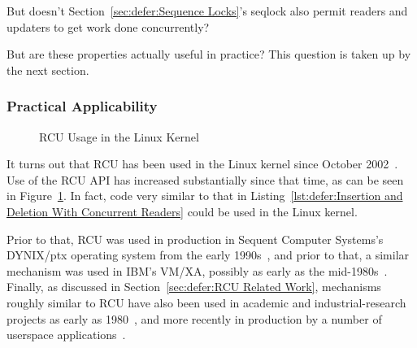 \QuickQuiz{}
	But doesn't Section~\ref{sec:defer:Sequence Locks}'s seqlock
	also permit readers and updaters to get work done concurrently?
 \QuickQuizEnd

But are these properties actually useful in practice?
This question is taken up by the next section.

\subsubsection{Practical Applicability}
\label{sec:defer:Practical Applicability}

\begin{figure}[tb]
\centering
{}
\caption{RCU Usage in the Linux Kernel}
\label{fig:defer:RCU Usage in the Linux Kernel}
\end{figure}

It turns out that RCU has been used in the Linux kernel since
October 2002~\cite{Torvalds2.5.43}.
Use of the RCU API has increased substantially since that time,
as can be seen in
Figure~\ref{fig:defer:RCU Usage in the Linux Kernel}.
In fact, code very similar to that in
Listing~\ref{lst:defer:Insertion and Deletion With Concurrent Readers}
could be used in the Linux kernel.

Prior to that, RCU was used in production in Sequent Computer Systems's
DYNIX/ptx operating system from the early 1990s~\cite{McKenney98},
and prior to that, a similar mechanism was used in IBM's
VM/XA, possibly as early as the mid-1980s~\cite{Hennessy89}.
Finally, as discussed in
Section~\ref{sec:defer:RCU Related Work},
mechanisms roughly similar to RCU have also been used
in academic and industrial-research projects as early as
1980~\cite{Kung80},
and more recently in production by a number of userspace
applications~\cite{MathieuDesnoyers2009URCU,MikeDay2013RCUqemu,GeoffRomer2018C++DeferredReclamationP0561R4}.

